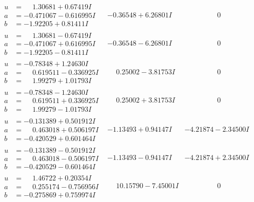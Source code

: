 \documentclass[1p]{elsarticle_modified}
\theoremstyle{definition}
\begin{document}
$$\begin{array}{c|c|c}
\begin{aligned}
u &= \phantom{-}1.30681 + 0.67419 I \\
a &= -0.471067 - 0.616995 I \\
b &= -1.92205 + 0.81411 I\end{aligned}
 & -0.36548 + 6.26801 I & \phantom{-0.000000 } 0 \\ \hline\begin{aligned}
u &= \phantom{-}1.30681 - 0.67419 I \\
a &= -0.471067 + 0.616995 I \\
b &= -1.92205 - 0.81411 I\end{aligned}
 & -0.36548 - 6.26801 I & \phantom{-0.000000 } 0 \\ \hline\begin{aligned}
u &= -0.78348 + 1.24630 I \\
a &= \phantom{-}0.619511 - 0.336925 I \\
b &= \phantom{-}1.99279 + 1.01793 I\end{aligned}
 & \phantom{-}0.25002 - 3.81753 I & \phantom{-0.000000 } 0 \\ \hline\begin{aligned}
u &= -0.78348 - 1.24630 I \\
a &= \phantom{-}0.619511 + 0.336925 I \\
b &= \phantom{-}1.99279 - 1.01793 I\end{aligned}
 & \phantom{-}0.25002 + 3.81753 I & \phantom{-0.000000 } 0 \\ \hline\begin{aligned}
u &= -0.131389 + 0.501912 I \\
a &= \phantom{-}0.463018 + 0.506197 I \\
b &= -0.420529 + 0.601464 I\end{aligned}
 & -1.13493 + 0.94147 I & -4.21874 - 2.34500 I \\ \hline\begin{aligned}
u &= -0.131389 - 0.501912 I \\
a &= \phantom{-}0.463018 - 0.506197 I \\
b &= -0.420529 - 0.601464 I\end{aligned}
 & -1.13493 - 0.94147 I & -4.21874 + 2.34500 I \\ \hline\begin{aligned}
u &= \phantom{-}1.46722 + 0.20354 I \\
a &= \phantom{-}0.255174 - 0.756956 I \\
b &= -0.275869 + 0.759974 I\end{aligned}
 & \phantom{-}10.15790 - 7.45001 I & \phantom{-0.000000 } 0 \\ \hline\begin{aligned}

\end{aligned}
\end{array}$$
\end{document}
